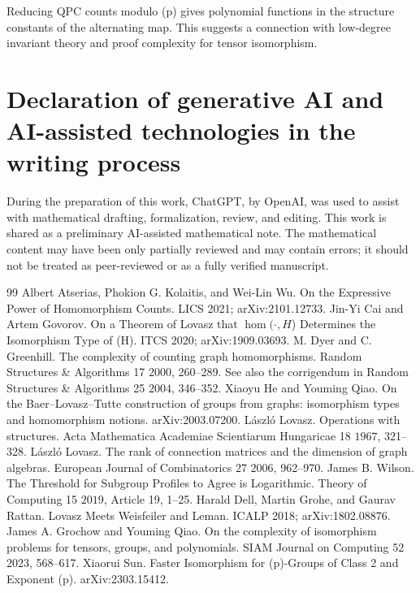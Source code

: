 \documentclass[11pt]{article}
\begin{document}
Reducing QPC counts modulo (p) gives polynomial functions in the structure constants of the alternating map. This suggests a connection with low-degree invariant theory and proof complexity for tensor isomorphism.


\section*{Declaration of generative AI and AI-assisted technologies in the writing process}
During the preparation of this work, ChatGPT, by OpenAI, was used to assist with mathematical drafting, formalization, review, and editing. This work is shared as a preliminary AI-assisted mathematical note. The mathematical content may have been only partially reviewed and may contain errors; it should not be treated as peer-reviewed or as a fully verified manuscript.

\begin{thebibliography}{99}
 Albert Atserias, Phokion G. Kolaitis, and Wei-Lin Wu. On the Expressive Power of Homomorphism Counts. LICS 2021; arXiv:2101.12733.
 Jin-Yi Cai and Artem Govorov. On a Theorem of Lovasz that $\operatorname{hom}(\cdot,H$) Determines the Isomorphism Type of (H). ITCS 2020; arXiv:1909.03693.
 M. Dyer and C. Greenhill. The complexity of counting graph homomorphisms. Random Structures \& Algorithms 17 $2000$, 260--289. See also the corrigendum in Random Structures \& Algorithms 25 $2004$, 346--352.
 Xiaoyu He and Youming Qiao. On the Baer--Lovasz--Tutte construction of groups from graphs: isomorphism types and homomorphism notions. arXiv:2003.07200.
 László Lovasz. Operations with structures. Acta Mathematica Academiae Scientiarum Hungaricae 18 $1967$, 321--328.
 László Lovasz. The rank of connection matrices and the dimension of graph algebras. European Journal of Combinatorics 27 $2006$, 962--970.
 James B. Wilson. The Threshold for Subgroup Profiles to Agree is Logarithmic. Theory of Computing 15 $2019$, Article 19, 1--25.
 Harald Dell, Martin Grohe, and Gaurav Rattan. Lovasz Meets Weisfeiler and Leman. ICALP 2018; arXiv:1802.08876.
 James A. Grochow and Youming Qiao. On the complexity of isomorphism problems for tensors, groups, and polynomials. SIAM Journal on Computing 52 $2023$, 568--617.
 Xiaorui Sun. Faster Isomorphism for (p)-Groups of Class 2 and Exponent (p). arXiv:2303.15412.
\end{thebibliography}
\end{document}
